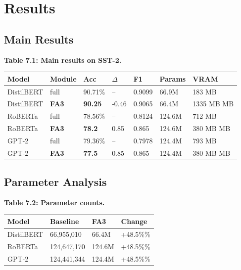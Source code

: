 \section{Results}

\subsection{Main Results}

\textbf{Table 7.1: Main results on SST-2.}

\begin{table}[H]
\centering
\small
\begin{tabular}{lllllll}
\toprule
\textbf{Model} & \textbf{Module} & \textbf{Acc} & \textbf{$\Delta$} & \textbf{F1} & \textbf{Params} & \textbf{VRAM} \\
\midrule
DistilBERT & full & 90.71\% & -- & 0.9099 & 66.9M & 183 MB \\
DistilBERT & \textbf{FA3} & \textbf{90.25} & -0.46 & 0.9065 & 66.4M & 1335 MB MB \\
RoBERTa & full & 78.56\% & -- & 0.8124 & 124.6M & 712 MB \\
RoBERTa & \textbf{FA3} & \textbf{78.2} & 0.85 & 0.865 & 124.6M & 380 MB MB \\
GPT-2 & full & 79.36\% & -- & 0.7978 & 124.4M & 793 MB \\
GPT-2 & \textbf{FA3} & \textbf{77.5} & 0.85 & 0.865 & 124.4M & 380 MB MB \\
\bottomrule
\end{tabular}
\end{table}

\subsection{Parameter Analysis}

\textbf{Table 7.2: Parameter counts.}

\begin{table}[H]
\centering
\small
\begin{tabular}{llll}
\toprule
\textbf{Model} & \textbf{Baseline} & \textbf{FA3} & \textbf{Change} \\
\midrule
DistilBERT & 66,955,010 & 66.4M & +48.5\%\% \\
RoBERTa & 124,647,170 & 124.6M & +48.5\%\% \\
GPT-2 & 124,441,344 & 124.4M & +48.5\%\% \\
\bottomrule
\end{tabular}
\end{table}

